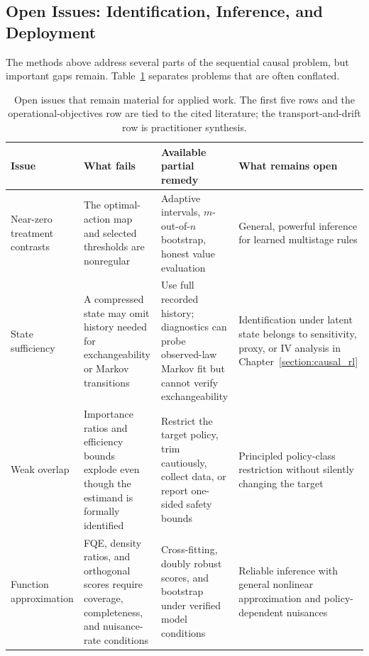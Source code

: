 \subsection{Open Issues: Identification, Inference, and Deployment}
\label{subsec:rlci_open_issues}

The methods above address several parts of the sequential causal problem, but important gaps remain. Table~\ref{tab:rlci_open_issues} separates problems that are often conflated.

\begin{table}[htbp]
\centering
\caption{Open issues that remain material for applied work. The first five rows and the operational-objectives row are tied to the cited literature; the transport-and-drift row is practitioner synthesis.}
\label{tab:rlci_open_issues}
{\footnotesize
\renewcommand{\arraystretch}{1.12}
\begin{tabularx}{\textwidth}{p{} p{} p{} >{\raggedright\arraybackslash}X}
\toprule
Issue & What fails & Available partial remedy & What remains open \\
\midrule
Near-zero treatment contrasts & The optimal-action map and selected thresholds are nonregular & Adaptive intervals, $m$-out-of-$n$ bootstrap, honest value evaluation & General, powerful inference for learned multistage rules \citep{laber2014dtrchallenges, wangtom2025dtrtutorial} \\
State sufficiency & A compressed state may omit history needed for exchangeability or Markov transitions & Use full recorded history; diagnostics can probe observed-law Markov fit but cannot verify exchangeability & Identification under latent state belongs to sensitivity, proxy, or IV analysis in Chapter~\ref{section:causal_rl} \\
Weak overlap & Importance ratios and efficiency bounds explode even though the estimand is formally identified & Restrict the target policy, trim cautiously, collect data, or report one-sided safety bounds & Principled policy-class restriction without silently changing the target \citep{ueharaShiKallus2022ope} \\
Function approximation & FQE, density ratios, and orthogonal scores require coverage, completeness, and nuisance-rate conditions & Cross-fitting, doubly robust scores, and bootstrap under verified model conditions & Reliable inference with general nonlinear approximation and policy-dependent nuisances \citep{hao2021bootstrapfqe, kallusUehara2022doubleRL} \\

\end{tabularx}}
\end{table}
